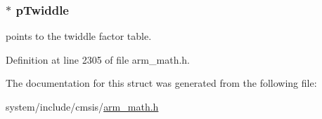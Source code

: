\subsubsection[{\texorpdfstring{p\+Twiddle}{pTwiddle}}]{$\ast$ p\+Twiddle}\hypertarget{structarm__dct4__instance__q31_a2505b7d5ec077b244c712797a5253b6d}{}\label{structarm__dct4__instance__q31_a2505b7d5ec077b244c712797a5253b6d}
points to the twiddle factor table. 

Definition at line 2305 of file arm\+\_\+math.\+h.



The documentation for this struct was generated from the following file\+:\begin{DoxyCompactItemize}
\item 
system/include/cmsis/\hyperlink{arm__math_8h}{arm\+\_\+math.\+h}\end{DoxyCompactItemize}
